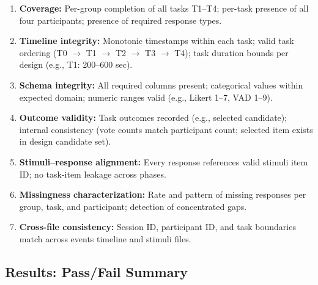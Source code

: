 \documentclass[11pt,a4paper]{article}
\begin{document}
\begin{enumerate}
  \item \textbf{Coverage:} Per-group completion of all tasks T1–T4;
    per-task presence of all four participants; presence of required response types.
  \item \textbf{Timeline integrity:} Monotonic timestamps within each task;
    valid task ordering (T0 $\to$ T1 $\to$ T2 $\to$ T3 $\to$ T4);
    task duration bounds per design (e.g., T1: 200–600 sec).
  \item \textbf{Schema integrity:} All required columns present;
    categorical values within expected domain; numeric ranges valid
    (e.g., Likert 1–7, VAD 1–9).
  \item \textbf{Outcome validity:} Task outcomes recorded (e.g., selected candidate);
    internal consistency (vote counts match participant count;
    selected item exists in design candidate set).
  \item \textbf{Stimuli--response alignment:} Every response references valid
    stimuli item ID; no task-item leakage across phases.
  \item \textbf{Missingness characterization:} Rate and pattern of missing responses
    per group, task, and participant; detection of concentrated gaps.
  \item \textbf{Cross-file consistency:} Session ID, participant ID, and task
    boundaries match across events timeline and stimuli files.
\end{enumerate}

\subsection{Results: Pass/Fail Summary}
\end{document}
